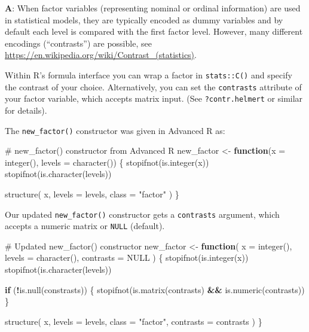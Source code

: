 \documentclass[
]{krantz}
\makeatletter
\newenvironment{Shaded}{\begin{snugshade}}{\end{snugshade}}
\newcommand{\CommentTok}[1]{\textcolor[rgb]{0.56,0.35,0.01}{\textit{#1}}}
\newcommand{\ControlFlowTok}[1]{\textcolor[rgb]{0.13,0.29,0.53}{\textbf{#1}}}
\newcommand{\DataTypeTok}[1]{\textcolor[rgb]{0.13,0.29,0.53}{#1}}
\newcommand{\KeywordTok}[1]{\textcolor[rgb]{0.13,0.29,0.53}{\textbf{#1}}}
\newcommand{\NormalTok}[1]{#1}
\newcommand{\OperatorTok}[1]{\textcolor[rgb]{0.81,0.36,0.00}{\textbf{#1}}}
\newcommand{\OtherTok}[1]{\textcolor[rgb]{0.56,0.35,0.01}{#1}}
\newcommand{\StringTok}[1]{\textcolor[rgb]{0.31,0.60,0.02}{#1}}
\newenvironment{kframe}{%
\medskip{}
\setlength{\fboxsep}{.8em}
 \def\at@end@of@kframe{}%
 \ifinner\ifhmode%
  \def\at@end@of@kframe{\end{minipage}}%
  \begin{minipage}{\columnwidth}%
 \fi\fi%
 \def\FrameCommand##1{\hskip\@totalleftmargin \hskip-\fboxsep
 \colorbox{shadecolor}{##1}\hskip-\fboxsep
     \hskip-\linewidth \hskip-\@totalleftmargin \hskip\columnwidth}%
 \MakeFramed {\advance\hsize-\width
   \@totalleftmargin\z@ \linewidth\hsize
   \@setminipage}}%
 {\par\unskip\endMakeFramed%
 \at@end@of@kframe}
\renewenvironment{Shaded}{\begin{kframe}}{\end{kframe}}
\renewcommand{\KeywordTok} [1]{\textcolor[rgb]{0.00,0.44,0.13}{{#1}}}
\renewcommand{\DataTypeTok}[1]{\textcolor[rgb]{0.56,0.13,0.00}{{#1}}}
\renewcommand{\StringTok}  [1]{\textcolor[rgb]{0.25,0.44,0.63}{{#1}}}
\renewcommand{\CommentTok} [1]{\textcolor[rgb]{0.38,0.63,0.69}{{#1}}}
\renewcommand{\OtherTok}   [1]{\textcolor[rgb]{0.00,0.44,0.13}{{#1}}}
\renewcommand{\NormalTok}  [1]{{#1}}
\makeatother
\begin{document}
\textbf{{A}}: When factor variables (representing nominal or ordinal information) are used in statistical models, they are typically encoded as dummy variables and by default each level is compared with the first factor level. However, many different encodings (``contrasts'') are possible, see \url{https://en.wikipedia.org/wiki/Contrast_(statistics)}.

Within R's formula interface you can wrap a factor in \texttt{stats::C()} and specify the contrast of your choice. Alternatively, you can set the \texttt{contrasts} attribute of your factor variable, which accepts matrix input. (See \texttt{?contr.helmert} or similar for details).

The \texttt{new\_factor()} constructor was given in Advanced R as:

\begin{Shaded}
\begin{Highlighting}[]
\CommentTok{# new_factor() constructor from Advanced R}
\NormalTok{new_factor <-}\StringTok{ }\ControlFlowTok{function}\NormalTok{(}\DataTypeTok{x =} \KeywordTok{integer}\NormalTok{(), }\DataTypeTok{levels =} \KeywordTok{character}\NormalTok{()) \{}
  \KeywordTok{stopifnot}\NormalTok{(}\KeywordTok{is.integer}\NormalTok{(x))}
  \KeywordTok{stopifnot}\NormalTok{(}\KeywordTok{is.character}\NormalTok{(levels))}

  \KeywordTok{structure}\NormalTok{(}
\NormalTok{    x,}
    \DataTypeTok{levels =}\NormalTok{ levels,}
    \DataTypeTok{class =} \StringTok{"factor"}
\NormalTok{  )}
\NormalTok{\}}
\end{Highlighting}
\end{Shaded}

Our updated \texttt{new\_factor()} constructor gets a \texttt{contrasts} argument, which accepts a numeric matrix or \texttt{NULL} (default).

\begin{Shaded}
\begin{Highlighting}[]
\CommentTok{# Updated new_factor() constructor}
\NormalTok{new_factor <-}\StringTok{ }\ControlFlowTok{function}\NormalTok{(}
  \DataTypeTok{x =} \KeywordTok{integer}\NormalTok{(),}
  \DataTypeTok{levels =} \KeywordTok{character}\NormalTok{(),}
  \DataTypeTok{contrasts =} \OtherTok{NULL}
\NormalTok{) \{}
  \KeywordTok{stopifnot}\NormalTok{(}\KeywordTok{is.integer}\NormalTok{(x))}
  \KeywordTok{stopifnot}\NormalTok{(}\KeywordTok{is.character}\NormalTok{(levels))}
  
  \ControlFlowTok{if}\NormalTok{ (}\OperatorTok{!}\KeywordTok{is.null}\NormalTok{(constrasts)) \{}
    \KeywordTok{stopifnot}\NormalTok{(}\KeywordTok{is.matrix}\NormalTok{(contrasts) }\OperatorTok{&&}\StringTok{ }\KeywordTok{is.numeric}\NormalTok{(contrasts))}
\NormalTok{  \}}
  
  \KeywordTok{structure}\NormalTok{(}
\NormalTok{    x,}
    \DataTypeTok{levels =}\NormalTok{ levels,}
    \DataTypeTok{class =} \StringTok{"factor"}\NormalTok{,}
    \DataTypeTok{contrasts =}\NormalTok{ contrasts}
\NormalTok{  )}
\NormalTok{\}}
\end{Highlighting}
\end{Shaded}
\end{document}

